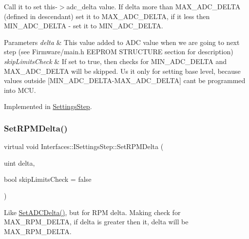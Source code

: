 Call it to set this-\/$>$adc\+\_\+delta value. If delta more than M\+A\+X\+\_\+\+A\+D\+C\+\_\+\+D\+E\+L\+TA (defined in descendant) set it to M\+A\+X\+\_\+\+A\+D\+C\+\_\+\+D\+E\+L\+TA, if it less then M\+I\+N\+\_\+\+A\+D\+C\+\_\+\+D\+E\+L\+TA -\/ set it to M\+I\+N\+\_\+\+A\+D\+C\+\_\+\+D\+E\+L\+TA. 


\begin{DoxyParams}{Parameters}
{\em delta} & This value added to A\+DC value when we are going to next step (see Firmware/main.\+h E\+E\+P\+R\+OM S\+T\+R\+U\+C\+T\+U\+RE section for description) \\
\hline
{\em skip\+Limits\+Check} & If set to true, then checks for M\+I\+N\+\_\+\+A\+D\+C\+\_\+\+D\+E\+L\+TA and M\+A\+X\+\_\+\+A\+D\+C\+\_\+\+D\+E\+L\+TA will be skipped. Us it only for setting base level, because values outside \mbox{[}M\+I\+N\+\_\+\+A\+D\+C\+\_\+\+D\+E\+L\+T\+A-\/\+M\+A\+X\+\_\+\+A\+D\+C\+\_\+\+D\+E\+L\+TA\mbox{]} can\textquotesingle{}t be programmed into M\+CU. \\
\hline
\end{DoxyParams}


Implemented in \hyperlink{class_settings_step_a8124c87ae0b1d9fb3b623144d0e492db}{Settings\+Step}.

\mbox{\label{class_interfaces_1_1_i_settings_step_a62997701dc6ad91ec0a9d699ef99463e}} 
\subsubsection{\texorpdfstring{Set\+R\+P\+M\+Delta()}{SetRPMDelta()}}
{\footnotesize\ttfamily virtual void Interfaces\+::\+I\+Settings\+Step\+::\+Set\+R\+P\+M\+Delta (\begin{DoxyParamCaption}\item[{uint}]{delta,  }\item[{bool}]{skip\+Limits\+Check = {\ttfamily false} }\end{DoxyParamCaption})\hspace{0.3cm}{\ttfamily [pure virtual]}}



Like \hyperlink{class_interfaces_1_1_i_settings_step_a83f00b8b66f6566721065e34e41508c6}{Set\+A\+D\+C\+Delta()}, but for R\+PM delta. Making check for M\+A\+X\+\_\+\+R\+P\+M\+\_\+\+D\+E\+L\+TA, if delta is greater then it, delta will be M\+A\+X\+\_\+\+R\+P\+M\+\_\+\+D\+E\+L\+TA. 


